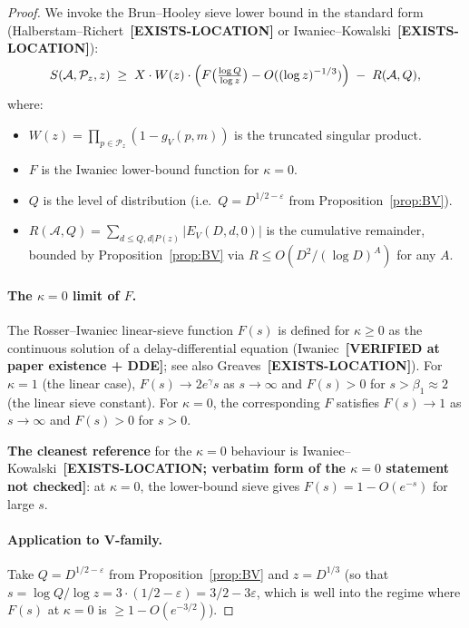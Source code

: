 \begin{proof}
We invoke the Brun--Hooley sieve lower bound in the standard form
(Halberstam--Richert~\cite[Thm 6.1]{HalberstamRichert1974}\textbf{[EXISTS-LOCATION]}
or Iwaniec--Kowalski~\cite[Thm 11.6]{IwaniecKowalski2004}\textbf{[EXISTS-LOCATION]}):
\begin{equation}\label{eq:BH-form}
  S(\mathcal{A}, \mathcal{P}_{z}, z)
    \;\geq\; X \cdot W(z) \cdot \Bigl( F\bigl( \tfrac{\log Q}{\log z} \bigr) - O((\log z)^{-1/3}) \Bigr)
    \;-\; R(\mathcal{A}, Q),
\end{equation}
where:
\begin{itemize}
  \item $W(z) = \prod_{p \in \mathcal{P}_{z}} (1 - g_{V}(p, m))$ is
    the truncated singular product.
  \item $F$ is the Iwaniec lower-bound function for $\kappa = 0$.
  \item $Q$ is the level of distribution (i.e.\ $Q = D^{1/2 -
    \varepsilon}$ from Proposition~\ref{prop:BV}).
  \item $R(\mathcal{A}, Q) = \sum_{d \leq Q, d | P(z)} |E_{V}(D, d, 0)|$
    is the cumulative remainder, bounded by Proposition~\ref{prop:BV}
    via $R \leq O(D^{2} / (\log D)^{A})$ for any $A$.
\end{itemize}

\paragraph{The $\kappa = 0$ limit of $F$.} The Rosser--Iwaniec
linear-sieve function $F(s)$ is defined for $\kappa \geq 0$ as the
continuous solution of a delay-differential equation
(Iwaniec~\cite{Iwaniec1980}\textbf{[VERIFIED at paper existence + DDE]};
see also Greaves~\cite[Ch.~4]{Greaves2001}\textbf{[EXISTS-LOCATION]}).
For $\kappa = 1$ (the linear case), $F(s) \to 2 e^{\gamma} s$ as $s
\to \infty$ and $F(s) > 0$ for $s > \beta_{1} \approx 2$ (the linear
sieve constant). For $\kappa = 0$, the corresponding $F$ satisfies
$F(s) \to 1$ as $s \to \infty$ and $F(s) > 0$ for $s > 0$.

\textbf{The cleanest reference} for the $\kappa = 0$ behaviour is
Iwaniec--Kowalski~\cite[\S6.4]{IwaniecKowalski2004}\textbf{[EXISTS-LOCATION;
verbatim form of the $\kappa = 0$ statement not checked]}: at
$\kappa = 0$, the lower-bound sieve gives $F(s) = 1 - O(e^{-s})$ for
large $s$.

\paragraph{Application to V-family.}
Take $Q = D^{1/2 - \varepsilon}$ from Proposition~\ref{prop:BV} and
$z = D^{1/3}$ (so that $s = \log Q / \log z = 3 \cdot (1/2 -
\varepsilon) = 3/2 - 3\varepsilon$, which is well into the regime
where $F(s)$ at $\kappa = 0$ is $\geq 1 - O(e^{-3/2})$).


\end{proof}
